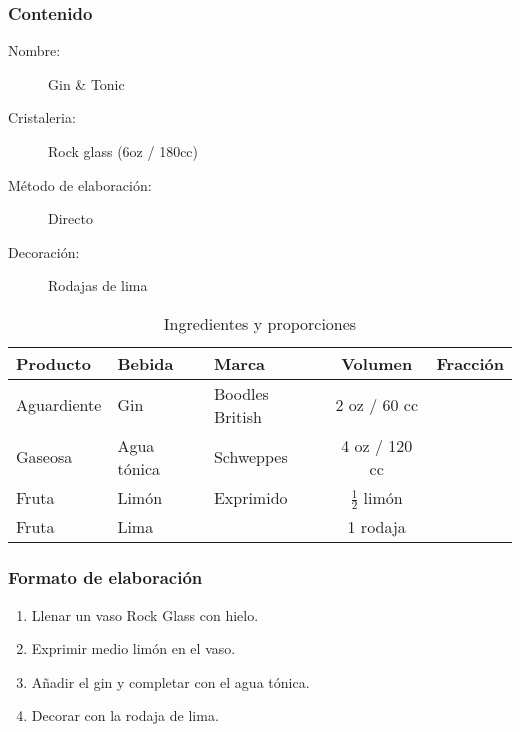 \bigskip 
\bigskip 
 
\subsubsection{Contenido}
\bigskip 
\begin{description}
\item[Nombre:] Gin \& Tonic
\item[Cristaleria:] Rock glass (6oz / 180cc)
\item[M\'etodo de elaboraci\'on:] Directo
\item[Decoraci\'on:] Rodajas de lima
\end{description}

\begin{table}[h]
\caption{Ingredientes y proporciones} 
\label{tab:fonts}
\begin{center}       
\begin{tabular}{|l|l|l|c|l|} %
\hline
\rule[-1ex]{0pt}{3.5ex}  \textbf{Producto} & \textbf{Bebida} & \textbf{Marca} & \textbf{Volumen} & \textbf{Fracci\'on}  \\
\hline
\rule[-1ex]{0pt}{3.5ex}  Aguardiente & Gin 			& Boodles British 		& 2 oz / 60 cc 	&  	\\
\hline
\rule[-1ex]{0pt}{3.5ex}  Gaseosa		& Agua t\'onica 	& Schweppes 				& 4 oz / 120 cc 		&  	\\
\hline
\rule[-1ex]{0pt}{3.5ex}  Fruta 		& Lim\'on	 	& Exprimido				& $\frac{1}{2}$	lim\'on		& 	\\
\hline
\rule[-1ex]{0pt}{3.5ex}  Fruta 		& Lima		 	& 						& 1 rodaja		& 	\\
\hline
\end{tabular}
\end{center}
\end{table} 
\bigskip 

\subsubsection{Formato de elaboraci\'on} 
\label{sec:title}
\bigskip 
\begin{center}
\begin{enumerate}
\item Llenar un vaso Rock Glass con hielo.
\item Exprimir medio lim\'on en el vaso.
\item A\~nadir el gin y completar con el agua t\'onica.
\item Decorar con la rodaja de lima.
\end{enumerate}
\end{center}
\bigskip \bigskip 
\bigskip 


